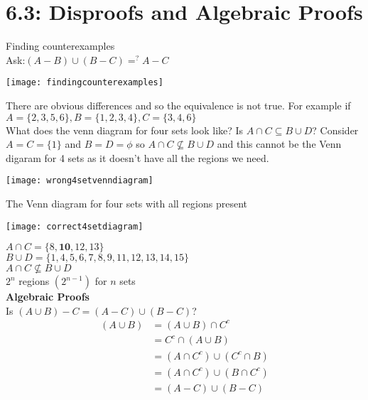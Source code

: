 \documentclass[12pt,letterpaper, onecolumn]{exam}
\begin{document}
	\section{6.3: Disproofs and Algebraic Proofs}
	Finding counterexamples\\
	Ask:$(A-B)\cup(B-C)=^?A-C$
	\begin{center}
		\texttt{[image: findingcounterexamples]}
	\end{center}
	There are obvious differences and so the equivalence is not true. For example if $A=\{2,3,5,6\}, B=\{1,2,3,4\}, C=\{3,4,6\}$\\
	What does the venn diagram for four sets look like?
	Is $A\cap C \subseteq B\cup D$? Consider $A=C=\{1\}$ and $B=D=\phi$ so $A\cap C\not\subseteq B\cup D$ and this cannot be the Venn digaram for 4 sets as it doesn't have all the regions we need.
	\begin{center}
		\texttt{[image: wrong4setvenndiagram]}
	\end{center}
	The Venn diagram for four sets with all regions present
	\begin{center}
		\texttt{[image: correct4setdiagram]}
	\end{center}
	$A \cap C =\{8,\textbf{10},12,13\}$\\
	$B \cup D =\{1,4,5,6,7,8,9,11,12,13,14,15\}$\\
	$A \cap C \not\subseteq B \cup D$\\
	$2^n$ regions $(2^{n-1})$ for $n$ sets\\
	\textbf{Algebraic Proofs}\\
	Is $(A\cup B)-C=(A-C)\cup (B-C)$?
	\begin{align*}
		(A\cup B)&=(A\cup B)\cap C^c\tag*{By definition of minus}\\
		&= C^c \cap (A\cup B) \tag*{By commutativity}\\
		&=(A\cap C^c)\cup(C^c\cap B)\tag*{By distribution}\\
		&=(A\cap C^c)\cup(B\cap C^c)\tag*{By commutativity}\\
		&=(A-C)\cup(B-C)\tag*{By definition of minus}
	\end{align*}
\end{document}
